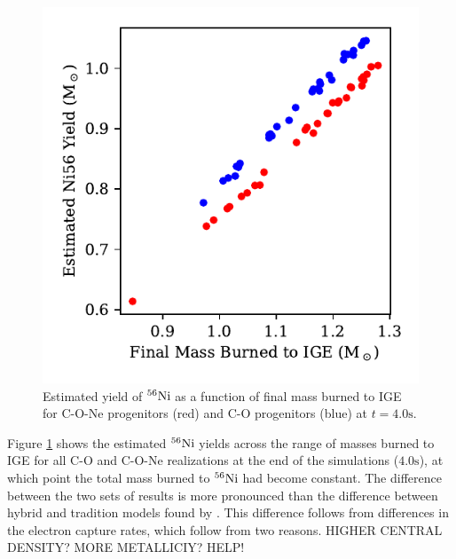 \documentclass[iop,apj]{emulateapj}
\newcommand{\Ni}[1]{\ensuremath{{}^{#1}{\rm Ni}}}
\newcommand{\unitstyle}[1]{\ensuremath{\mathrm{#1}}}
\newcommand{\second}{\unitstyle{s}}
\begin{document}
\begin{figure}
\includegraphics[width=\columnwidth]{figures/FMBTI_v_Ni56Yield_plot.pdf}
\caption{\label{fig:conversion}
Estimated yield of \Ni{56} as a function of final mass burned to IGE
for C-O-Ne progenitors (red) and C-O progenitors (blue) at
$t = 4.0 \second$.
}
\end{figure}
Figure \ref{fig:conversion} shows the estimated \Ni{56} yields 
across the range of masses burned to IGE
for all C-O and C-O-Ne realizations at the end 
of the simulations ($4.0 \second$),
at which point the total mass burned to \Ni{56} had become constant.
The difference between the two sets of results is more pronounced
than the difference between hybrid and tradition models
found by \citet{willcoxetal2016}. This difference follows from
differences in the electron capture rates, which follow from
{\color{red} two} reasons. {\color{red} HIGHER CENTRAL DENSITY?
MORE METALLICIY? HELP!}
\end{document}
